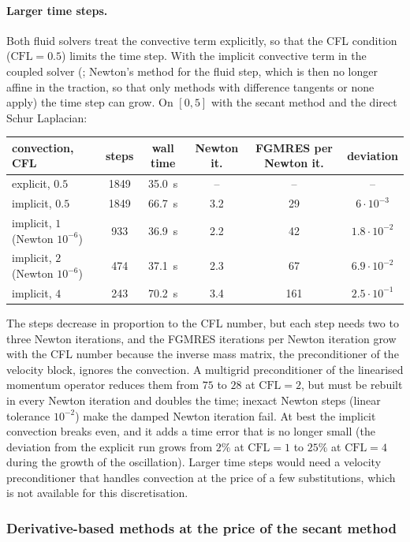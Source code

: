 \documentclass[11pt,a4paper]{article}
\theoremstyle{definition}
\theoremstyle{remark}
\begin{document}
\paragraph{Larger time steps.} Both fluid solvers treat the convective term explicitly, so that the
CFL condition ($\mathrm{CFL}=0.5$) limits the time step. With the implicit convective term in the
coupled solver (; Newton's method for the fluid step, which is then
no longer affine in the traction, so that only methods with difference tangents or none apply) the
time step can grow. On $[0,5]$ with the secant method and the direct Schur Laplacian:
\begin{center}
\begin{tabular}{lccccc}
\toprule
convection, CFL & steps & wall time & Newton it. & FGMRES per Newton it. & deviation\\
\midrule
explicit, $0.5$ & 1849 & 35.0~s & -- & -- & --\\
implicit, $0.5$ & 1849 & 66.7~s & 3.2 & 29 & $6\cdot10^{-3}$\\
implicit, $1$ (Newton $10^{-6}$) & 933 & 36.9~s & 2.2 & 42 & $1.8\cdot10^{-2}$\\
implicit, $2$ (Newton $10^{-6}$) & 474 & 37.1~s & 2.3 & 67 & $6.9\cdot10^{-2}$\\
implicit, $4$ & 243 & 70.2~s & 3.4 & 161 & $2.5\cdot10^{-1}$\\
\bottomrule
\end{tabular}
\end{center}
The steps decrease in proportion to the CFL number, but each step needs two to three Newton
iterations, and the FGMRES iterations per Newton iteration grow with the CFL number because the
inverse mass matrix, the preconditioner of the velocity block, ignores the convection. A multigrid
preconditioner of the linearised momentum operator reduces them from $75$ to $28$ at
$\mathrm{CFL}=2$, but must be rebuilt in every Newton iteration and doubles the time; inexact Newton
steps (linear tolerance $10^{-2}$) make the damped Newton iteration fail. At best the implicit
convection breaks even, and it adds a time error that is no longer small (the deviation from the
explicit run grows from $2\%$ at $\mathrm{CFL}=1$ to $25\%$ at $\mathrm{CFL}=4$ during the growth of
the oscillation). Larger time steps would need a velocity preconditioner that handles convection at
the price of a few substitutions, which is not available for this discretisation.

\subsubsection{Derivative-based methods at the price of the secant method}\label{sec:fast_model}
\end{document}
